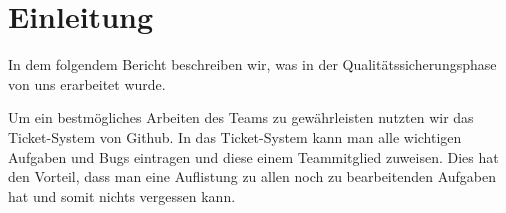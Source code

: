 %



\chapter{Einleitung}
\label{Kapitel:Einleitung}
In dem folgendem Bericht beschreiben wir, was in der Qualitätssicherungsphase von uns erarbeitet wurde.

Um ein bestmögliches Arbeiten des Teams zu gewährleisten nutzten wir das Ticket-System von Github. In das Ticket-System kann man alle wichtigen Aufgaben und Bugs eintragen und diese einem Teammitglied zuweisen. Dies hat den Vorteil, dass man eine Auflistung zu allen noch zu bearbeitenden Aufgaben hat und somit nichts vergessen kann.
 











